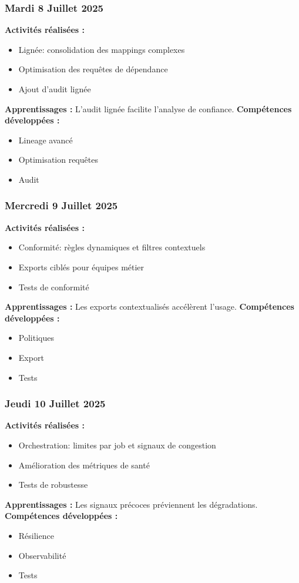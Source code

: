 \documentclass[12pt,a4paper]{article}
\begin{document}
\subsubsection{Mardi 8 Juillet 2025}
\textbf{Activités réalisées :}
\begin{itemize}
    \item Lignée: consolidation des mappings complexes
    \item Optimisation des requêtes de dépendance
    \item Ajout d'audit lignée
\end{itemize}
\textbf{Apprentissages :} L'audit lignée facilite l'analyse de confiance.
\textbf{Compétences développées :}
\begin{itemize}
    \item Lineage avancé
    \item Optimisation requêtes
    \item Audit
\end{itemize}

\subsubsection{Mercredi 9 Juillet 2025}
\textbf{Activités réalisées :}
\begin{itemize}
    \item Conformité: règles dynamiques et filtres contextuels
    \item Exports ciblés pour équipes métier
    \item Tests de conformité
\end{itemize}
\textbf{Apprentissages :} Les exports contextualisés accélèrent l'usage.
\textbf{Compétences développées :}
\begin{itemize}
    \item Politiques
    \item Export
    \item Tests
\end{itemize}

\subsubsection{Jeudi 10 Juillet 2025}
\textbf{Activités réalisées :}
\begin{itemize}
    \item Orchestration: limites par job et signaux de congestion
    \item Amélioration des métriques de santé
    \item Tests de robustesse
\end{itemize}
\textbf{Apprentissages :} Les signaux précoces préviennent les dégradations.
\textbf{Compétences développées :}
\begin{itemize}
    \item Résilience
    \item Observabilité
    \item Tests
\end{itemize}
\end{document}
